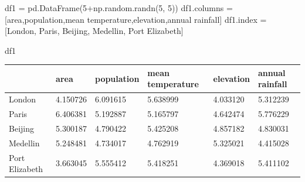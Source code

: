 \documentclass[
  letterpaper,
  DIV=11,
  numbers=noendperiod]{scrreprt}
\newenvironment{Shaded}{\begin{snugshade}}{\end{snugshade}}
\newcommand{\DecValTok}[1]{\textcolor[rgb]{0.68,0.00,0.00}{#1}}
\newcommand{\NormalTok}[1]{\textcolor[rgb]{0.00,0.23,0.31}{#1}}
\newcommand{\OperatorTok}[1]{\textcolor[rgb]{0.37,0.37,0.37}{#1}}
\newcommand{\StringTok}[1]{\textcolor[rgb]{0.13,0.47,0.30}{#1}}
\begin{document}
\begin{Shaded}
\begin{Highlighting}[]
\NormalTok{df1 }\OperatorTok{=}\NormalTok{ pd.DataFrame(}\DecValTok{5}\OperatorTok{+}\NormalTok{np.random.randn(}\DecValTok{5}\NormalTok{, }\DecValTok{5}\NormalTok{))}
\NormalTok{df1.columns }\OperatorTok{=}\NormalTok{ [}\StringTok{\textquotesingle{}area\textquotesingle{}}\NormalTok{,}\StringTok{\textquotesingle{}population\textquotesingle{}}\NormalTok{,}\StringTok{\textquotesingle{}mean temperature\textquotesingle{}}\NormalTok{,}\StringTok{\textquotesingle{}elevation\textquotesingle{}}\NormalTok{,}\StringTok{\textquotesingle{}annual rainfall\textquotesingle{}}\NormalTok{]}
\NormalTok{df1.index }\OperatorTok{=}\NormalTok{ [}\StringTok{\textquotesingle{}London\textquotesingle{}}\NormalTok{, }\StringTok{\textquotesingle{}Paris\textquotesingle{}}\NormalTok{, }\StringTok{\textquotesingle{}Beijing\textquotesingle{}}\NormalTok{, }\StringTok{\textquotesingle{}Medellin\textquotesingle{}}\NormalTok{, }\StringTok{\textquotesingle{}Port Elizabeth\textquotesingle{}}\NormalTok{]}
\end{Highlighting}
\end{Shaded}

\begin{Shaded}
\begin{Highlighting}[]
\NormalTok{df1}
\end{Highlighting}
\end{Shaded}

\begin{longtable}[]{@{}llllll@{}}
\toprule\noalign{}
& area & population & mean temperature & elevation & annual rainfall \\
\midrule\noalign{}
\endhead
\bottomrule\noalign{}
\endlastfoot
London & 4.150726 & 6.091615 & 5.638999 & 4.033120 & 5.312239 \\
Paris & 6.406381 & 5.192887 & 5.165797 & 4.642474 & 5.776229 \\
Beijing & 5.300187 & 4.790422 & 5.425208 & 4.857182 & 4.830031 \\
Medellin & 5.248481 & 4.734017 & 4.762919 & 5.325021 & 4.415028 \\
Port Elizabeth & 3.663045 & 5.555412 & 5.418251 & 4.369018 & 5.411102 \\
\end{longtable}
\end{document}
